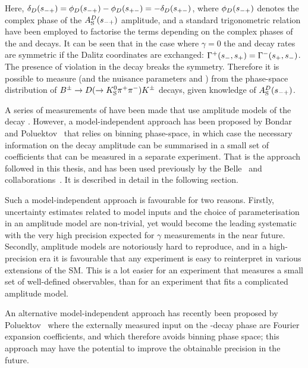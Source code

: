 Here, $\delta_{D}(s_{-+}) = \phi_D(s_{-+}) - \phi_D(s_{+-}) = - \delta_D(s_{+-})$, where $\phi_D(s_{-+})$ denotes the complex phase of the $A_{\rm S}^{D}(s_{-+})$ amplitude, and a standard trigonometric relation have been employed to factorise the terms depending on the complex phases of the \B and \D decays. It can be seen that in the case where $\gamma=0$ the \Bp and \Bm decay rates are symmetric if the Dalitz coordinates are exchanged: $\Gamma^+(s_-, s_+)=\Gamma^-(s_+, s_-)$. The presence of \CP violation in the \B decay breaks the symmetry. Therefore it is possible to measure \g (and the nuisance parameters \rB and \dB) from the phase-space distribution of ${{B}^\pm}\rightarrow{\ensuremath{D}}(\rightarrow{\ensuremath{{K}^0_{\mathrm{S}}}} \pi^+ \pi^-){{K}^\pm}$ decays, given knowledge of $A_{\rm S}^{D}(s_{-+})$.

A series of measurements of \g have been made that use amplitude models of the \D decay \cite{BABAR2005,BABAR2008,BABAR2010, BELLE2004,BELLE2006,BELLE2010,LHCb-PAPER-2014-017,LHCb-PAPER-2016-007}. However, 
a model-independent approach has been proposed by Bondar and Poluektov~\cite{bondarFeasibilityStudyModelindependent2006,bondarUseQuantumcorrelatedD02008} that relies on binning phase-space, in which case the necessary information on the \D decay amplitude can be summarised in a small set of coefficients that can be measured in a separate experiment. That is the approach followed in this thesis, and has been used previously by the Belle~\cite{BELLEMODIND} and \lhcb collaborations~\cite{LHCb-PAPER-2012-027}. It is described in detail in the following section.

Such a model-independent approach is favourable for two reasons. Firstly, uncertainty estimates related to model inputs and the choice of parameterisation in an amplitude model are non-trivial, yet would become the leading systematic with the very high precision expected for $\gamma$ measurements in the near future. Secondly, amplitude models are notoriously hard to reproduce, and in a high-precision era it is favourable that any experiment is easy to reinterpret in various extensions of the SM. This is a lot easier for an experiment that measures a small set of well-defined observables, than for an experiment that fits a complicated amplitude model.

An alternative model-independent approach has recently been proposed by Poluektov~\cite{poluektovUnbinnedModelindependentMeasurements2018} where the externally measured input on the \D-decay phase are Fourier expansion coefficients, and which therefore avoids binning phase space; this approach may have the potential to improve the obtainable precision in the future.

